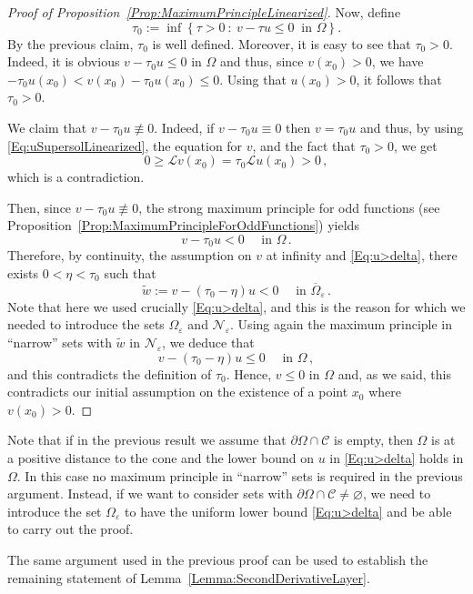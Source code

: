 \documentclass[12pt,reqno]{amsart}
\theoremstyle{definition}
\theoremstyle{remark}
\newcommand{\ccal}{\mathscr{C}}
\newcommand{\ncal}{\mathcal{N}}
\newcommand{\setcond}[2]{\left \{ #1 \ : \ #2  \right \}}
\numberwithin{equation}{section}
\begin{document}
\begin{proof}[Proof of Proposition~\ref{Prop:MaximumPrincipleLinearized}]
	Now, define 
	$$
	\tau_0:= \inf \setcond{\tau > 0}{v - \tau u \leq 0 \ \textrm{ in } \Omega}.
	$$
	By the previous claim, $\tau_0$ is well defined. Moreover, it is easy to see that $\tau_0 > 0$. Indeed, it is obvious $v - \tau_0 u \leq 0 $ in $\Omega$ and thus, since $v(x_0)>0$, we have $-\tau_0 u(x_0) < v(x_0) - \tau_0 u (x_0) \leq 0$. Using that $u(x_0)>0$, it follows that  $\tau_0 > 0$.
	
	We claim that $v - \tau_0 u \not \equiv 0$. Indeed, if $v - \tau_0 u \equiv 0$ then $v = \tau_0 u$ and thus, by using \eqref{Eq:uSupersolLinearized}, the equation for $v$, and the fact that $\tau_0 > 0$, we get 
	$$
	0 \geq \mathscr{L} v(x_0) = \tau_0 \mathscr{L} u(x_0) > 0\,, 
	$$
	which is a contradiction.
	
	Then, since $v - \tau_0 u \not \equiv 0$, the strong maximum principle for odd functions (see Proposition~\ref{Prop:MaximumPrincipleForOddFunctions}) yields
	$$
	v - \tau_0 u < 0 \quad \textrm{ in }\Omega\,.
	$$
	Therefore, by continuity, the assumption on $v$ at infinity and \eqref{Eq:u>delta}, there exists $0 < \eta <\tau_0$ such that 
	$$
	\tilde{w} := v - (\tau_0 - \eta) u < 0 \quad \textrm{ in }\overline{\Omega}_\varepsilon\,.
	$$
	Note that here we used crucially \eqref{Eq:u>delta}, and this is the reason for which we needed to introduce the sets $\Omega_\varepsilon$ and $\ncal_\varepsilon$. Using again the maximum principle in ``narrow'' sets with $\tilde{w}$ in $\ncal_\varepsilon$, we deduce that 
	$$
	v - (\tau_0 - \eta) u \leq 0 \quad \textrm{ in }\Omega\,,
	$$
	and this contradicts the definition of $\tau_0$. Hence, $v\leq 0$ in $\Omega$ and, as we said, this contradicts our initial assumption on the existence of a point $x_0$ where $v(x_0)>0$.
\end{proof}


Note that if in the previous result we assume that $\partial\Omega \cap \ccal$ is empty, then $\Omega$ is at a positive distance to the cone and the lower bound on $u$ in \eqref{Eq:u>delta} holds in $\Omega$. In this case no maximum principle in ``narrow'' sets is required in the previous argument. Instead, if we want to consider sets with $\partial\Omega \cap \ccal \neq \varnothing$, we need to introduce the set $\Omega_\varepsilon$ to have the uniform lower bound \eqref{Eq:u>delta} and be able to carry out the proof.

The same argument used in the previous proof can be used to establish the remaining statement of Lemma~\ref{Lemma:SecondDerivativeLayer}.
\end{document}
